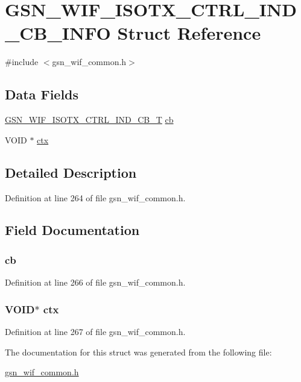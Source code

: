\hypertarget{a00339}{
\section{GSN\_\-WIF\_\-ISOTX\_\-CTRL\_\-IND\_\-CB\_\-INFO Struct Reference}
\label{a00339}
}


{\ttfamily \#include $<$gsn\_\-wif\_\-common.h$>$}

\subsection*{Data Fields}
\begin{DoxyCompactItemize}
\item 
\hyperlink{a00635_gac721992ff2f8c904a29e80d4b2eaead3}{GSN\_\-WIF\_\-ISOTX\_\-CTRL\_\-IND\_\-CB\_\-T} \hyperlink{a00339_a985c144d4fe5ce3091fde7f21b528274}{cb}
\item 
VOID $\ast$ \hyperlink{a00339_add401254b29adaa41706c97d1c8d3e89}{ctx}
\end{DoxyCompactItemize}


\subsection{Detailed Description}


Definition at line 264 of file gsn\_\-wif\_\-common.h.



\subsection{Field Documentation}
\hypertarget{a00339_a985c144d4fe5ce3091fde7f21b528274}{
\subsubsection[{cb}]{ {\bf cb}}}
\label{a00339_a985c144d4fe5ce3091fde7f21b528274}


Definition at line 266 of file gsn\_\-wif\_\-common.h.

\hypertarget{a00339_add401254b29adaa41706c97d1c8d3e89}{
\subsubsection[{ctx}]{\setlength{\rightskip}{0pt plus 5cm}VOID$\ast$ {\bf ctx}}}
\label{a00339_add401254b29adaa41706c97d1c8d3e89}


Definition at line 267 of file gsn\_\-wif\_\-common.h.



The documentation for this struct was generated from the following file:\begin{DoxyCompactItemize}
\item 
\hyperlink{a00608}{gsn\_\-wif\_\-common.h}\end{DoxyCompactItemize}
